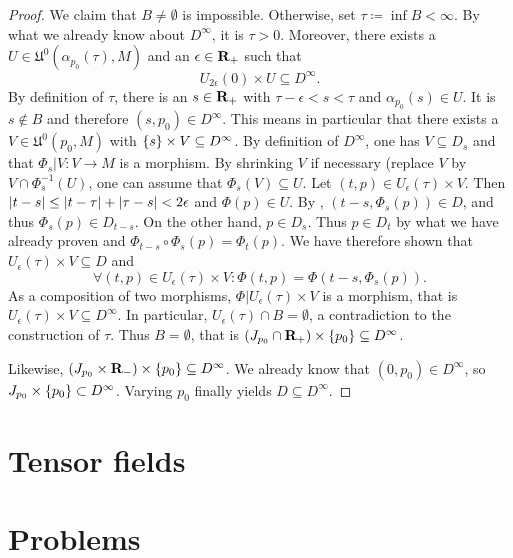 \begin{proof}
  We claim that $B \neq \emptyset$ is impossible. Otherwise, set $\tau
  \coloneqq \inf B < \infty$. By what we already know about $D^\infty$, it is
  $\tau > 0$. Moreover, there exists a $U \in \mathfrak U^0(\alpha_{p_0}(\tau),
  M)$ and an $\epsilon \in \mathbf{R}_+$ such that
  \begin{equation}
    \label{eq:flow_proof}
    U_{2\epsilon}(0) \times U \subseteq D^\infty.
  \end{equation}
  By definition of $\tau$, there is an $s \in \mathbf{R}_+$
  with $\tau - \epsilon < s < \tau$ and $\alpha_{p_0}(s) \in U$. It is
  $s \notin B$ and therefore $(s, p_0) \in D^\infty$. This means in particular
  that there exists a $V \in \mathfrak U^0(p_0, M)$ with $\lbrace s\rbrace \times V
  \subseteq D^\infty$. By definition of $D^\infty$, one has $V \subseteq
  D_s$ and that $\Phi_s|V\colon V \to M$ is a morphism. By shrinking $V$ if
  necessary (replace $V$ by $V \cap \Phi_s^{-1}(U)$, one can assume that
  $\Phi_s(V) \subseteq U$. Let $(t, p) \in U_\epsilon(\tau) \times V$. Then
  $\lvert t - s\rvert \leq \lvert t - \tau\rvert + \lvert\tau - s\rvert < 2 \epsilon$ and
  $\Phi(p) \in U$. By , $(t - s, \Phi_s(p)) \in D$,
  and thus $\Phi_s(p) \in D_{t - s}$. On the other hand, $p \in D_s$. Thus
  $p \in D_t$ by what we have already proven and $\Phi_{t - s} \circ \Phi_s(p)
  = \Phi_t(p)$. We have therefore shown that $U_\epsilon(\tau) \times V
  \subseteq D$ and
  \[
    \forall (t, p) \in U_\epsilon(\tau) \times V:
      \Phi(t, p) = \Phi(t - s, \Phi_s(p)).
  \]
  As a composition of two morphisms, $\Phi|U_\epsilon(\tau) \times V$ is a 
  morphism, that is $U_\epsilon(\tau) \times V \subseteq D^\infty$. In particular,
  $U_\epsilon(\tau) \cap B = \emptyset$, a contradiction to the construction of
  $\tau$. Thus $B = \emptyset$, that is $(J_{p_0} \cap \mathbf{R}_+) \times \lbrace p_0\rbrace
  \subseteq D^\infty$.
  
  Likewise, $(J_{p_0} \times \mathbf{R}_{-}) \times \lbrace p_0\rbrace \subseteq D^\infty$.
  We already know that $(0, p_0) \in D^\infty$, so $J_{p_0} \times \lbrace p_0\rbrace
  \subset D^\infty$. Varying $p_0$ finally yields $D \subseteq D^\infty$.
\end{proof}




\section{Tensor fields}

\section{Problems}

